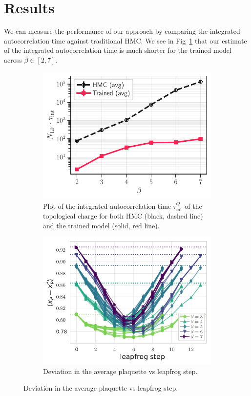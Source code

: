\documentclass[a4paper,11pt]{article}
\begin{document}
\section{\label{sec:results}Results}
We can measure the performance of our approach by comparing the integrated
autocorrelation time against traditional HMC.
%
We see in Fig~\ref{fig:autocorr} that our estimate of the integrated
autocorrelation time is much shorter for the trained model across \(\beta \in
[2, 7]\).
%
\begin{figure}[htpb]
    \centering
    \begin{subfigure}[t]{0.49\textwidth}
        \includegraphics[width=\textwidth]{assets/autocorr_vs_beta.pdf}
        \caption{\label{fig:autocorr} Plot of the integrated autocorrelation
        time \(\tau_{\mathrm{int}}^{Q}\) of the topological charge for both HMC
    (black, dashed line) and the trained model (solid, red line).}
    \end{subfigure}
    \begin{subfigure}[t]{0.49\textwidth}
        \includegraphics[width=\textwidth]{assets/plaqsf_beta.pdf}
        \caption{\label{fig:plaqsf_beta}Deviation in the average plaquette vs
        leapfrog step.}
    \end{subfigure}
\end{figure}
\end{document}
